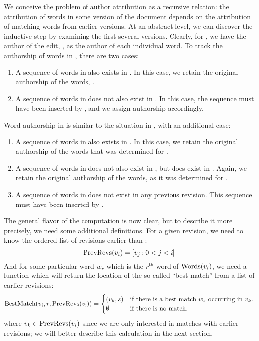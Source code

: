 We conceive the problem of author attribution as a recursive relation:
the attribution of words in some version of the document depends on the
attribution of matching words from earlier versions.
At an abstract level, we can discover the inductive step by examining
the first several versions.
Clearly, for , we have the author of the edit,
, as the author of each individual word.
To track the authorship of words in , there are two cases:
\begin{enumerate}
\item A sequence of words in  also exists in .
	In this case, we retain the original authorship of the words,
	.
\item A sequence of words in  does not also exist in .
	In this case, the sequence must have been inserted by
	, and we assign authorship accordingly.
\end{enumerate}
Word authorship in  is similar to the situation in
, with an additional case:
\begin{enumerate}
\item A sequence of words in  also exists in .
	In this case, we retain the original authorship of the words
	that was determined for .
\item A sequence of words in  does not also exist in ,
	but does exist in .
	Again, we retain the original authorship of the words, as it was
	determined for .
\item A sequence of words in  does not exist in any previous
	revision.
	This sequence must have been inserted by .
\end{enumerate}

The general flavor of the computation is now clear, but to describe it
more precisely, we need some additional definitions.
For a given revision, we need to know the ordered list of revisions
earlier than :
\begin{equation}
    \prevrevs{\version{i}} = \left[ \version{j} \colon  0 < j < i \right]
\label{def:prevrevs}
\end{equation}
And for some particular
word $w_r$ which is the $r^{\text{th}}$ word of $\mathrm{Words}(v_{i})$,
we need a function which will return the location of the so-called
``best match'' from a list of earlier revisions:
\begin{equation}
    \match{\version{i}, r, \prevrevs{\version{i}}} =
    \begin{cases}
	(\version{k}, s) & \text{if there is a best match $w_s$ occurring in \version{k}.} \\
	\emptyset & \text{if there is no match.} \\
    \end{cases}
\label{def:bestmatch}
\end{equation}
where $v_{k} \in \mathrm{PrevRevs}(v_{i})$ since we are only
interested in matches with earlier revisions; we will better describe
this calculation in the next section.

